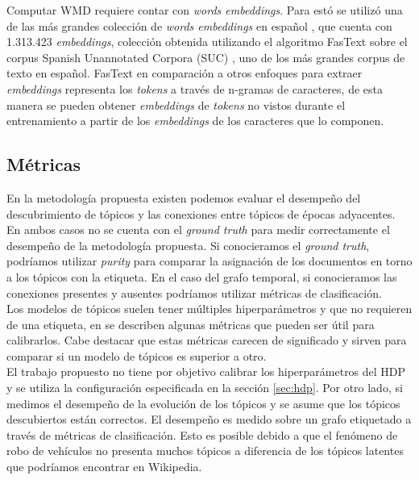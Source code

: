 \documentclass[letterpaper,12pt,oneside]{book} %
\begin{document}
Computar WMD requiere contar con \textit{words embeddings}. Para estó se utilizó una de las más grandes colección de \textit{words embeddings} en español \citep{fastextSUC}, que cuenta con 1.313.423 \textit{embeddings}, colección obtenida utilizando el algoritmo FasText \citep{bojanowski2017enriching} sobre el corpus Spanish Unannotated Corpora (SUC) \citep{josecanneteSUC}, uno de los más grandes corpus de texto en español. FasText en comparación a otros enfoques para extraer \textit{embeddings} representa los \textit{tokens} a través de n-gramas de caracteres, de esta manera se pueden obtener \textit{embeddings} de \textit{tokens} no vistos durante el entrenamiento a partir de los \textit{embeddings} de los caracteres que lo componen.

\subsection{Métricas}

En la metodología propuesta existen podemos evaluar el desempeño del descubrimiento de tópicos y las conexiones entre tópicos de épocas adyacentes. En ambos casos no se cuenta con el \textit{ground truth} para medir correctamente el desempeño de la metodología propuesta. Si conocieramos el \textit{ground truth}, podríamos utilizar \textit{purity} \citep{manning2008introduction} para comparar la asignación de los documentos en torno a los tópicos con la etiqueta. En el caso del grafo temporal, si conocieramos las conexiones presentes y ausentes podríamos utilizar métricas de clasificación.\\

Los modelos de tópicos suelen tener múltiples hiperparámetros y que no requieren de una etiqueta, en \citep{blei2003latent,griffiths2004finding,cao2009density,deveaud2014accurate,deveaud2014accurate,arun2010finding,zhang2017lda} se describen algunas métricas que pueden ser útil para calibrarlos. Cabe destacar que estas métricas carecen de significado y sirven para comparar si un modelo de tópicos es superior a otro.\\

El trabajo propuesto no tiene por objetivo calibrar los hiperparámetros del HDP y se utiliza la configuración especificada en la sección \ref{sec:hdp}. Por otro lado, si medimos el desempeño de la evolución de los tópicos y se asume que los tópicos descubiertos están correctos. El desempeño es medido sobre un grafo etiquetado a través de métricas de clasificación. Esto es posible  debido a que el fenómeno de robo de vehículos no presenta muchos tópicos a diferencia de los tópicos latentes que podríamos encontrar en Wikipedia.\\
\end{document}
